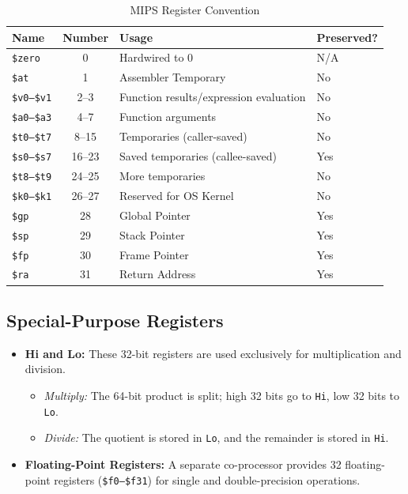\vspace{15pt}
\needspace{5cm}
\begin{table}[h]
\centering
\begin{tabular}{lcll}
\toprule
\textbf{Name} & \textbf{Number} & \textbf{Usage} & \textbf{Preserved?} \\
\midrule
\texttt{\$zero} & 0 & Hardwired to 0 & N/A \\
\texttt{\$at} & 1 & Assembler Temporary & No \\
\texttt{\$v0--\$v1} & 2--3 & Function results/expression evaluation & No \\
\texttt{\$a0--\$a3} & 4--7 & Function arguments & No \\
\texttt{\$t0--\$t7} & 8--15 & Temporaries (caller-saved) & No \\
\texttt{\$s0--\$s7} & 16--23 & Saved temporaries (callee-saved) & Yes \\
\texttt{\$t8--\$t9} & 24--25 & More temporaries & No \\
\texttt{\$k0--\$k1} & 26--27 & Reserved for OS Kernel & No \\
\texttt{\$gp} & 28 & Global Pointer & Yes \\
\texttt{\$sp} & 29 & Stack Pointer & Yes \\
\texttt{\$fp} & 30 & Frame Pointer & Yes \\
\texttt{\$ra} & 31 & Return Address & Yes \\
\bottomrule
\end{tabular}
\caption{MIPS Register Convention}
\end{table}

\subsection{Special-Purpose Registers}

\begin{itemize}
    \item \textbf{Hi and Lo:} These 32-bit registers are used exclusively for multiplication and division.

    \begin{itemize}
        \item \textit{Multiply:} The 64-bit product is split; high 32 bits go to \texttt{Hi}, low 32 bits to \texttt{Lo}.
        \item \textit{Divide:} The quotient is stored in \texttt{Lo}, and the remainder is stored in \texttt{Hi}.
    \end{itemize}

    \item \textbf{Floating-Point Registers:} A separate co-processor provides 32 floating-point registers (\texttt{\$f0--\$f31}) for single and double-precision operations.
\end{itemize}

